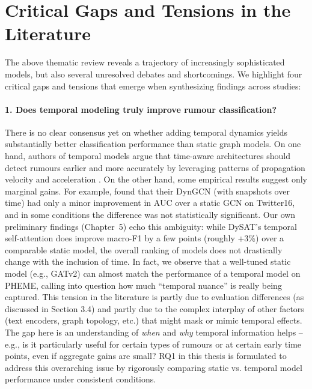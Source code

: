 \documentclass{cshonours}
\begin{document}
\section{Critical Gaps and Tensions in the Literature}
The above thematic review reveals a trajectory of increasingly sophisticated models, but also several unresolved debates and shortcomings. We highlight four critical gaps and tensions that emerge when synthesizing findings across studies:

\paragraph{1. Does temporal modeling truly improve rumour classification?} There is no clear consensus yet on whether adding temporal dynamics yields substantially better classification performance than static graph models. On one hand, authors of temporal models argue that time-aware architectures should detect rumours earlier and more accurately by leveraging patterns of propagation velocity and acceleration \cite{sankar2020dysat, liu2022STL}. On the other hand, some empirical results suggest only marginal gains. For example, \cite{choi2021dynGCN} found that their DynGCN (with snapshots over time) had only a minor improvement in AUC over a static GCN on Twitter16, and in some conditions the difference was not statistically significant. Our own preliminary findings (Chapter~5) echo this ambiguity: while DySAT’s temporal self-attention does improve macro-F1 by a few points (roughly +3\%) over a comparable static model, the overall ranking of models does not drastically change with the inclusion of time. In fact, we observe that a well-tuned static model (e.g., GATv2) can almost match the performance of a temporal model on PHEME, calling into question how much “temporal nuance” is really being captured. This tension in the literature is partly due to evaluation differences (as discussed in Section 3.4) and partly due to the complex interplay of other factors (text encoders, graph topology, etc.) that might mask or mimic temporal effects. The gap here is an understanding of \emph{when} and \emph{why} temporal information helps – e.g., is it particularly useful for certain types of rumours or at certain early time points, even if aggregate gains are small? RQ1 in this thesis is formulated to address this overarching issue by rigorously comparing static vs. temporal model performance under consistent conditions.
\end{document}
